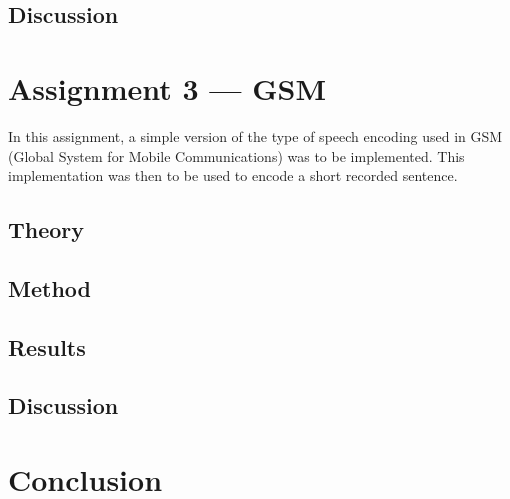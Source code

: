 \documentclass{IEEEtran}
\begin{document}
\subsection{Discussion}

\section{Assignment 3 --- GSM}

In this assignment, a simple version of the type of speech encoding used in GSM
(Global System for Mobile Communications) was to be implemented. This
implementation was then to be used to encode a short recorded sentence.

\subsection{Theory}
\subsection{Method}
\subsection{Results}
\subsection{Discussion}

\section{Conclusion}
\end{document}
